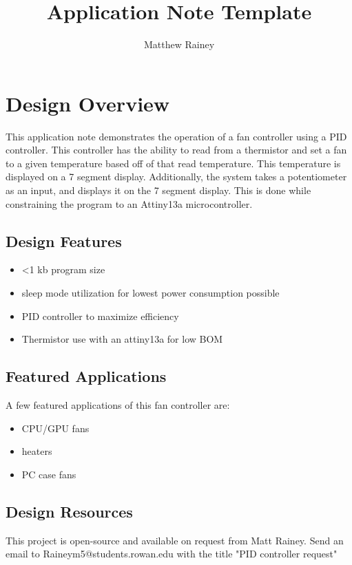 \documentclass{hitec}
\title{Application Note Template}
\author{Matthew Rainey}
\begin{document}
\maketitle
\section{Design Overview}

This application note demonstrates the operation of a fan controller using a PID controller. This controller has the ability to read from a thermistor and set a fan to a given temperature based off of that read temperature. This temperature is displayed on a 7 segment display. Additionally, the system takes a potentiometer as an input, and displays it on the 7 segment display. This is done while constraining the program to an Attiny13a microcontroller.
\\


\subsection{Design Features}
\begin{itemize}
\item <1 kb program size
\item sleep mode utilization for lowest power consumption possible
\item PID controller to maximize efficiency
\item Thermistor use with an attiny13a for low BOM
\end{itemize}
\subsection{Featured Applications}

A few featured applications of this fan controller are: \\
\begin{itemize}
\item CPU/GPU fans
\item heaters
\item PC case fans
\end{itemize}
\subsection{Design Resources}


This project is open-source and available on request from Matt Rainey. Send an email to Raineym5@students.rowan.edu with the title "PID controller request"
\end{document}
